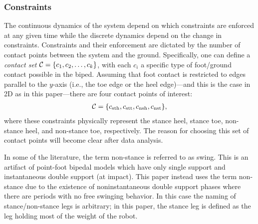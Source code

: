 
\subsubsection{Constraints} The continuous dynamics of the system depend on which constraints are enforced at any given time while the discrete dynamics depend on the change in constraints.  Constraints and their enforcement are dictated by the number of contact points between the system and the ground. Specifically, one can define a {\em contact set} $\mathcal{C} = \{c_{1}, c_{2}, \ldots, c_{k}\}$, with each $c_i$ a specific type of foot/ground contact possible in the biped. Assuming that foot contact is restricted to edges parallel to the $y$-axis (i.e., the toe edge or the heel edge)---and this is the case in 2D as in this paper---there are four contact points of interest:
\begin{align}
  \mathcal{C} =  \{c_{\mathrm{sth}}, c_{\mathrm{stt}}, c_{\mathrm{nsh}} , c_{\mathrm{nst}}\},
\end{align}
where these constraints physically represent the stance heel, stance toe, non-stance heel, and non-stance toe, respectively. The reason for choosing this set of contact points will become clear after data analysis.

\begin{remark}
  In some of the literature, the term non-stance is referred to as swing. This is an artifact of point-foot bipedal models which have only single support and instantaneous double support (at impact). This paper instead uses the term non-stance due to the existence of noninstantaneous double support phases where there are periods with no free swinging behavior. In this case the naming of stance/non-stance legs is arbitrary; in this paper, the stance leg is defined as the leg holding most of the weight of the robot.
\end{remark}



